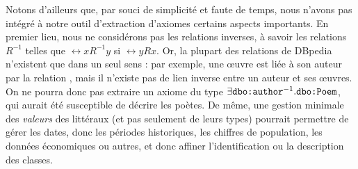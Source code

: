 Notons d'ailleurs que, par souci de simplicité et faute de temps, nous n'avons pas intégré à notre outil d'extraction d'axiomes certains aspects importants.
En premier lieu, nous ne considérons pas les relations inverses, à savoir les relations $R^{-1}$ telles que $\rel{x}{R^{-1}}{y}$ si $\rel{y}{R}{x}$. 
Or, la plupart des relations de DBpedia n'existent que dans un seul sens : par exemple, une œuvre est liée à son auteur par la relation , mais il n'existe pas de lien inverse entre un auteur et ses œuvres. On ne pourra donc pas extraire un axiome du type $\exists \texttt{dbo:author}^{-1}. \allowbreak \texttt{dbo:Poem}$, qui aurait été susceptible de décrire les poètes. De même, une gestion minimale des \textit{valeurs} des littéraux (et pas seulement de leurs types) pourrait permettre de gérer les dates, donc les périodes historiques, les chiffres de population, les données économiques ou autres, et donc affiner l'identification ou la description des classes.
